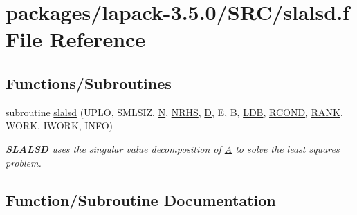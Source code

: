 \hypertarget{slalsd_8f}{}\section{packages/lapack-\/3.5.0/\+S\+R\+C/slalsd.f File Reference}
\label{slalsd_8f}
\subsection*{Functions/\+Subroutines}
\begin{DoxyCompactItemize}
\item 
subroutine \hyperlink{slalsd_8f_a153577749d4bb1c01aaf8b50636d2604}{slalsd} (U\+P\+L\+O, S\+M\+L\+S\+I\+Z, \hyperlink{polmisc_8c_a0240ac851181b84ac374872dc5434ee4}{N}, \hyperlink{example__user_8c_aa0138da002ce2a90360df2f521eb3198}{N\+R\+H\+S}, \hyperlink{odrpack_8h_a7dae6ea403d00f3687f24a874e67d139}{D}, E, B, \hyperlink{example__user_8c_a50e90a7104df172b5a89a06c47fcca04}{L\+D\+B}, \hyperlink{superlu__enum__consts_8h_af00a42ecad444bbda75cde1b64bd7e72a9b5c151728d8512307565994c89919d5}{R\+C\+O\+N\+D}, \hyperlink{splinemodule_8c_a3a88bcc63386de30443dacede2e01847}{R\+A\+N\+K}, W\+O\+R\+K, I\+W\+O\+R\+K, I\+N\+F\+O)
\begin{DoxyCompactList}\small\item\em {\bfseries S\+L\+A\+L\+S\+D} uses the singular value decomposition of \hyperlink{classA}{A} to solve the least squares problem. \end{DoxyCompactList}\end{DoxyCompactItemize}


\subsection{Function/\+Subroutine Documentation}
\hypertarget{slalsd_8f_a153577749d4bb1c01aaf8b50636d2604}{}
